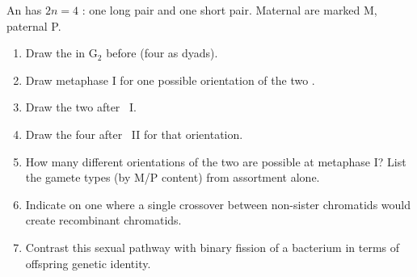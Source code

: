 \begin{problem}\label{pb:g11:meiosis-life-cycles:1}
An  has $2n = 4$ : one long pair and one short pair. Maternal
 are marked M, paternal P.
\begin{enumerate}
  \item Draw the  in G$_2$ before  (four  as dyads).
  \item Draw metaphase I for one possible orientation of the two .
  \item Draw the two  after ~I.
  \item Draw the four  after ~II for that orientation.
  \item How many different orientations of the two  are possible at
        metaphase I? List the gamete types (by M/P content) from assortment
        alone.
  \item Indicate on one  where a single crossover between non-sister
        chromatids would create recombinant chromatids.
  \item Contrast this sexual pathway with binary fission of a bacterium in terms
        of offspring genetic identity.
\end{enumerate}
\end{problem}
